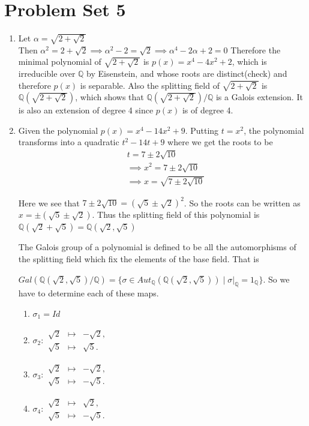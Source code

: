 \documentclass[12pt]{article}
\begin{document}
\section{Problem Set 5}
\begin{enumerate}
    \item[\bf{Soln 1: }] Let $\alpha=\sqrt{2+\sqrt2}$\\Then
    $\alpha^2=2+\sqrt2\implies \alpha^2-2=\sqrt2\implies\alpha^4-2\alpha+2=0$
    Therefore the minimal polynomial of $\sqrt{2+\sqrt2}$ is $p(x)=x^4-4x^2+2$, which is irreducible over $\mathbb{Q}$ by Eisenstein, and whose roots are distinct(check) and therefore $p(x)$ is separable.
    Also the splitting field of $\sqrt{2+\sqrt2}$ is $\mathbb{Q}(\sqrt{2+\sqrt2})$, which shows that $\mathbb{Q}(\sqrt{2+\sqrt2})/\mathbb{Q}$ is a Galois extension. It is also an extension of degree 4 since $p(x)$ is of degree 4.
    \item[\bf{Soln 2: }] Given the polynomial $p(x)=x^4-14x^2+9$. 
    Putting $t=x^2$, the polynomial transforms into a quadratic $t^2-14t+9$ where we get the roots to be\\
    \[
    \begin{aligned}
    &t=7\pm2\sqrt{10}\\
    &\implies x^2=7\pm2\sqrt{10}\\
    &\implies x=\sqrt{7\pm2\sqrt{10}}
    \end{aligned}
    \]

    Here we see that $7\pm2\sqrt{10}=(\sqrt5\pm\sqrt2)^2$.
     So the roots can be written as $x=\pm(\sqrt5\pm\sqrt2)$. Thus the splitting field of this polynomial is $\mathbb{Q}(\sqrt2+\sqrt5)=\mathbb{Q}(\sqrt2,\sqrt5)$

     The Galois group of a polynomial is defined to be all the automorphisms of the splitting field which fix the elements of the base field. That is
     
     
     $Gal(\mathbb{Q}(\sqrt2,\sqrt5)/\mathbb{Q})=\{\sigma \in Aut_\mathbb{Q}(\mathbb{Q}(\sqrt2,\sqrt5))\mid \sigma\vert_\mathbb{Q}=1_\mathbb{Q}\}$. So we have to determine each of these maps.

        \begin{enumerate}
            \item[1.] $\sigma_1=Id$
            \item[2.] $\sigma_2:
\begin{array}{rcl}
\sqrt{2} &\longmapsto& -\sqrt{2},\\[2pt]
\sqrt{5} &\longmapsto& \sqrt{5}.
\end{array}$
            \item[3.] $\sigma_3:
\begin{array}{rcl}
\sqrt{2} &\longmapsto& -\sqrt{2},\\[2pt]
\sqrt{5} &\longmapsto& -\sqrt{5}.
\end{array}$
        \item[4.] $\sigma_4:
\begin{array}{rcl}
\sqrt{2} &\longmapsto& \sqrt{2},\\[2pt]
\sqrt{5} &\longmapsto& -\sqrt{5}.
\end{array}$
        \end{enumerate}


\end{enumerate}
\end{document}
